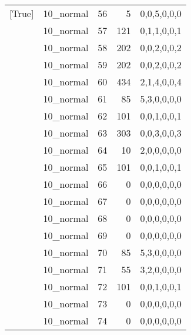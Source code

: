 \begin{tabular}{llrrl}
 [True]          & 10\_normal           &            56 &                     5 & 0,0,5,0,0,0   \\
 [True]          & 10\_normal           &            57 &                   121 & 0,1,1,0,0,1   \\
 [True]          & 10\_normal           &            58 &                   202 & 0,0,2,0,0,2   \\
 [True]          & 10\_normal           &            59 &                   202 & 0,0,2,0,0,2   \\
 [True]          & 10\_normal           &            60 &                   434 & 2,1,4,0,0,4   \\
 [True]          & 10\_normal           &            61 &                    85 & 5,3,0,0,0,0   \\
 [True]          & 10\_normal           &            62 &                   101 & 0,0,1,0,0,1   \\
 [True]          & 10\_normal           &            63 &                   303 & 0,0,3,0,0,3   \\
 [True]          & 10\_normal           &            64 &                    10 & 2,0,0,0,0,0   \\
 [True]          & 10\_normal           &            65 &                   101 & 0,0,1,0,0,1   \\
 [True]          & 10\_normal           &            66 &                     0 & 0,0,0,0,0,0   \\
 [True]          & 10\_normal           &            67 &                     0 & 0,0,0,0,0,0   \\
 [True]          & 10\_normal           &            68 &                     0 & 0,0,0,0,0,0   \\
 [True]          & 10\_normal           &            69 &                     0 & 0,0,0,0,0,0   \\
 [True]          & 10\_normal           &            70 &                    85 & 5,3,0,0,0,0   \\
 [True]          & 10\_normal           &            71 &                    55 & 3,2,0,0,0,0   \\
 [True]          & 10\_normal           &            72 &                   101 & 0,0,1,0,0,1   \\
 [True]          & 10\_normal           &            73 &                     0 & 0,0,0,0,0,0   \\
 [True]          & 10\_normal           &            74 &                     0 & 0,0,0,0,0,0   \\

\end{tabular}
